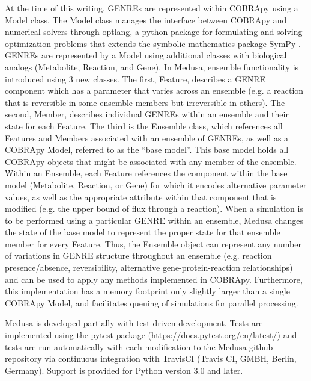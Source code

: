 \documentclass[11pt,twocolumn,notitlepage,openany,twoside]{book}
\begin{document}
\begin{refsection}
At the time of this writing, GENREs are represented within COBRApy using a Model class. The Model class manages the interface between COBRApy and numerical solvers through optlang, a python package for formulating and solving optimization problems that extends the symbolic mathematics package SymPy \cite{Jensen2016-nu,Meurer2017-mu}. GENREs are represented by a Model using additional classes with biological analogs (Metabolite, Reaction, and Gene). In Medusa, ensemble functionality is introduced using 3 new classes. The first, Feature, describes a GENRE component which has a parameter that varies across an ensemble (e.g. a reaction that is reversible in some ensemble members but irreversible in others). The second, Member, describes individual GENREs within an ensemble and their state for each Feature. The third is the Ensemble class, which references all Features and Members associated with an ensemble of GENREs, as well as a COBRApy Model, referred to as the “base model”. This base model holds all COBRApy objects that might be associated with any member of the ensemble. Within an Ensemble, each Feature references the component within the base model (Metabolite, Reaction, or Gene) for which it encodes alternative parameter values, as well as the appropriate attribute within that component that is modified (e.g. the upper bound of flux through a reaction). When a simulation is to be performed using a particular GENRE within an ensemble, Medusa changes the state of the base model to represent the proper state for that ensemble member for every Feature. Thus, the Ensemble object can represent any number of variations in GENRE structure throughout an ensemble (e.g. reaction presence/absence, reversibility, alternative gene-protein-reaction relationships) and can be used to apply any methods implemented in COBRApy. Furthermore, this implementation has a memory footprint only slightly larger than a single COBRApy Model, and facilitates queuing of simulations for parallel processing.

Medusa is developed partially with test-driven development. Tests are implemented using the pytest package (\url{https://docs.pytest.org/en/latest/}) and tests are run automatically with each modification to the Medusa github repository via continuous integration with TravisCI (Travis CI, GMBH, Berlin, Germany). Support is provided for Python version 3.0 and later.


\end{refsection}
\end{document}
